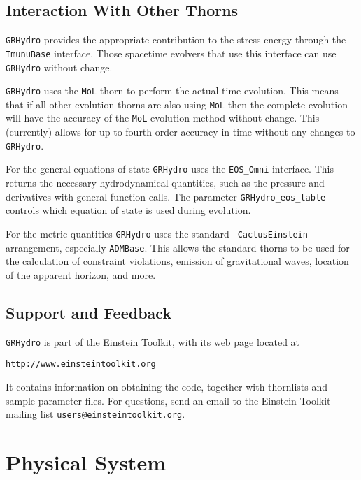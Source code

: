 \documentclass{article}
\begin{document}
\subsection{Interaction With Other Thorns}

{\tt GRHydro} provides the appropriate contribution to the stress energy
through the {\tt TmunuBase} interface. Those spacetime evolvers that
use this interface can use {\tt GRHydro} without change. 

{\tt GRHydro} uses the {\tt MoL} thorn to perform the actual time
evolution. This means that if all other evolution thorns are also
using {\tt MoL} then the complete evolution will have the accuracy of
the {\tt MoL} evolution method without change. This (currently) allows
for up to fourth-order accuracy in time without any changes to {\tt GRHydro}.

For the general equations of state {\tt GRHydro} uses the {\tt EOS\_Omni}
interface. This returns the necessary hydrodynamical quantities, such
as the pressure and derivatives with general function calls. The
parameter {\tt GRHydro\_eos\_table} controls which equation of state is
used during evolution.

For the metric quantities {\tt GRHydro} uses the standard {\tt
  CactusEinstein} arrangement, especially {\tt ADMBase}. This allows
the standard thorns to be used for the calculation of constraint
violations, emission of gravitational waves, location of the apparent
horizon, and more.

\subsection{Support and Feedback}

{\tt GRHydro} is part of the Einstein Toolkit, with its web page located at
\begin{verbatim}
http://www.einsteintoolkit.org
\end{verbatim}
It contains information on obtaining the code, together with
thornlists and sample parameter files. For questions, send an email
to the Einstein Toolkit mailing list {\tt users@einsteintoolkit.org}.

\section{Physical System}
\label{sec:phys}
\end{document}
